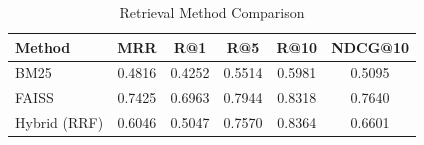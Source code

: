
\begin{table}[htbp]
\centering
\caption{Retrieval Method Comparison}
\label{tab:retrieval-ablation}
\begin{tabular}{lccccc}
\hline
\textbf{Method} & \textbf{MRR} & \textbf{R@1} & \textbf{R@5} & \textbf{R@10} & \textbf{NDCG@10} \\
\hline
BM25 & 0.4816 & 0.4252 & 0.5514 & 0.5981 & 0.5095 \\
FAISS & 0.7425 & 0.6963 & 0.7944 & 0.8318 & 0.7640 \\
Hybrid (RRF) & 0.6046 & 0.5047 & 0.7570 & 0.8364 & 0.6601 \\
\hline
\end{tabular}
\end{table}
